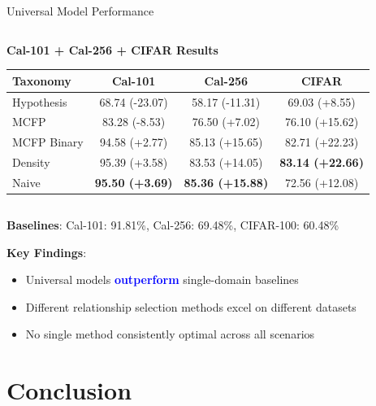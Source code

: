 \documentclass[aspectratio=169]{beamer}
\begin{document}
\begin{frame}{Universal Model Performance}
\begin{columns}[T]
        \begin{column}{0.48\textwidth}
            \textbf{Cal-101 + Cal-256 + CIFAR Results}
            \begin{table}[h]
                \centering
                \tiny
                \begin{tabular}{lccc}
                    \toprule
                    \textbf{Taxonomy} & \textbf{Cal-101}       & \textbf{Cal-256}        & \textbf{CIFAR}          \\
                    \midrule
                    Hypothesis        & 68.74 (-23.07)         & 58.17 (-11.31)          & 69.03 (+8.55)           \\
                    MCFP              & 83.28 (-8.53)          & 76.50 (+7.02)           & 76.10 (+15.62)          \\
                    MCFP Binary       & 94.58 (+2.77)          & 85.13 (+15.65)          & 82.71 (+22.23)          \\
                    Density           & 95.39 (+3.58)          & 83.53 (+14.05)          & \textbf{83.14 (+22.66)} \\
                    Naive             & \textbf{95.50 (+3.69)} & \textbf{85.36 (+15.88)} & 72.56 (+12.08)          \\
                    \bottomrule
                \end{tabular}
            \end{table}
        \end{column}
    \end{columns}

    \vspace{0.5em}

    \textbf{Baselines}: Cal-101: 91.81\%, Cal-256: 69.48\%, CIFAR-100: 60.48\%

    \textbf{Key Findings}:
    \begin{itemize}
        \item Universal models \textcolor{blue}{\textbf{outperform}} single-domain baselines
        \item Different relationship selection methods excel on different datasets
        \item No single method consistently optimal across all scenarios
    \end{itemize}
\end{frame}

\section{Conclusion}
\end{document}
